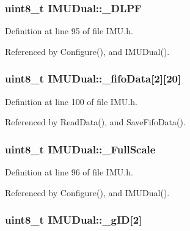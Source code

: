 \hypertarget{class_i_m_u_dual_a7778bbcb689a8f8c2fdfbea9f1b6d79f}{
\subsubsection[{\_\-DLPF}]{\setlength{\rightskip}{0pt plus 5cm}uint8\_\-t {\bf IMUDual::\_\-DLPF}}}
\label{class_i_m_u_dual_a7778bbcb689a8f8c2fdfbea9f1b6d79f}


Definition at line 95 of file IMU.h.



Referenced by Configure(), and IMUDual().

\hypertarget{class_i_m_u_dual_a9829db814da67788dd4250d95784c730}{
\subsubsection[{\_\-fifoData}]{\setlength{\rightskip}{0pt plus 5cm}uint8\_\-t {\bf IMUDual::\_\-fifoData}\mbox{[}2\mbox{]}\mbox{[}20\mbox{]}}}
\label{class_i_m_u_dual_a9829db814da67788dd4250d95784c730}


Definition at line 100 of file IMU.h.



Referenced by ReadData(), and SaveFifoData().

\hypertarget{class_i_m_u_dual_a5d84d161adb012a2f92d50257fa6a74b}{
\subsubsection[{\_\-FullScale}]{\setlength{\rightskip}{0pt plus 5cm}uint8\_\-t {\bf IMUDual::\_\-FullScale}}}
\label{class_i_m_u_dual_a5d84d161adb012a2f92d50257fa6a74b}


Definition at line 96 of file IMU.h.



Referenced by Configure(), and IMUDual().

\hypertarget{class_i_m_u_dual_a79c9ddf3a83582dbd9e9e4192361d3a4}{
\subsubsection[{\_\-gID}]{\setlength{\rightskip}{0pt plus 5cm}uint8\_\-t {\bf IMUDual::\_\-gID}\mbox{[}2\mbox{]}}}
\label{class_i_m_u_dual_a79c9ddf3a83582dbd9e9e4192361d3a4}


